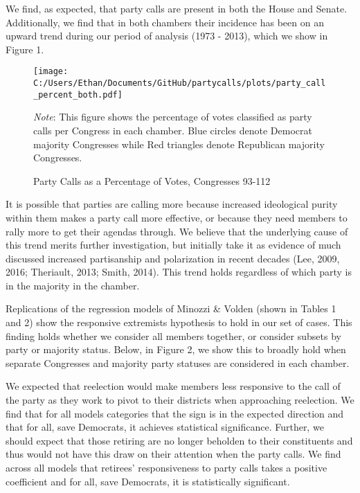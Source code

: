 \documentclass[12pt]{article}
\newcommand\fnote[1]{\captionsetup{font=small}\caption*{#1}}
\begin{document}
We find, as expected, that party calls are present in both the House and Senate. Additionally, we find that in both chambers their incidence has been on an upward trend during our period of analysis (1973 - 2013), which we show in Figure 1. 


\begin{figure}[H]
	\centering
	\caption{Party Calls as a Percentage of Votes, Congresses 93-112}
	\texttt{[image: C:/Users/Ethan/Documents/GitHub/partycalls/plots/party\_call\_percent\_both.pdf]}
	\fnote{\textit{Note}: This figure shows the percentage of votes classified as party calls per Congress in each chamber. Blue circles denote Democrat majority Congresses while Red triangles denote Republican majority Congresses.}
\end{figure}

\noindent
It is possible that parties are calling more because increased ideological purity within them makes a party call more effective, or because they need members to rally more to get their agendas through. We believe that the underlying cause of this trend merits further investigation, but initially take it as evidence of much discussed increased partisanship and polarization in recent decades (Lee, 2009, 2016; Theriault, 2013; Smith, 2014). This trend holds regardless of which party is in the majority in the chamber.

Replications of the regression models of Minozzi \& Volden (shown in Tables 1 and 2) show the responsive extremists hypothesis to hold in our set of cases. This finding holds whether we consider all members together, or consider subsets by party or majority status. Below, in Figure 2, we show this to broadly hold when separate Congresses and majority party statuses are considered in each chamber.

We expected that reelection would make members less responsive to the call of the party as they work to pivot to their districts when approaching reelection. We find that for all models categories that the sign is in the expected direction and that for all, save Democrats, it achieves statistical significance. Further, we should expect that those retiring are no longer beholden to their constituents and thus would not have this draw on their attention when the party calls. We find across all models that retirees' responsiveness to party calls takes a positive coefficient and for all, save Democrats, it is statistically significant. 
\end{document}

